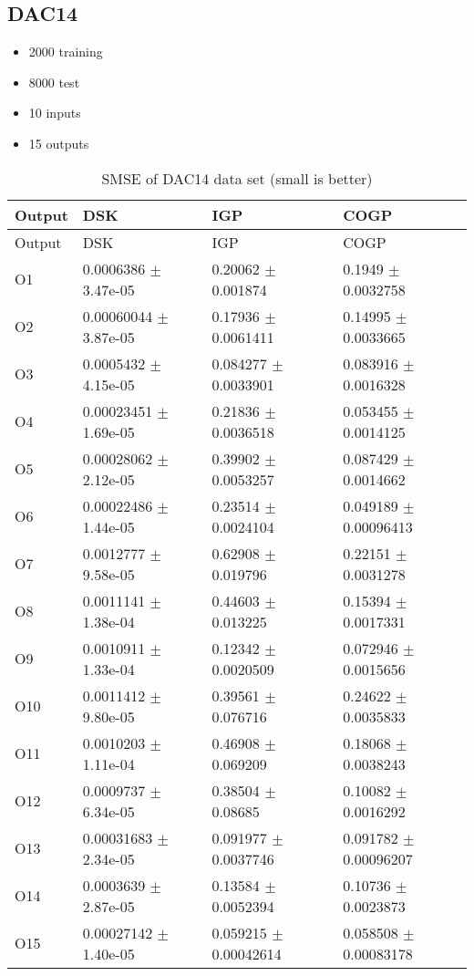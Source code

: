 \subsection{DAC14}\label{dac14}

\begin{itemize}
\item
  2000 training
\item
  8000 test
\item
  10 inputs
\item
  15 outputs
\end{itemize}

\begin{longtable}[]{@{}llll@{}}
\caption{SMSE of DAC14 data set (small is better)}\tabularnewline
\toprule
Output & DSK & IGP & COGP\tabularnewline
\midrule
\endfirsthead
\toprule
Output & DSK & IGP & COGP\tabularnewline
\midrule
\endhead
O1 & 0.0006386 \(\pm\) 3.47e-05 & 0.20062 \(\pm\) 0.001874 & 0.1949
\(\pm\) 0.0032758\tabularnewline
O2 & 0.00060044 \(\pm\) 3.87e-05 & 0.17936 \(\pm\) 0.0061411 & 0.14995
\(\pm\) 0.0033665\tabularnewline
O3 & 0.0005432 \(\pm\) 4.15e-05 & 0.084277 \(\pm\) 0.0033901 & 0.083916
\(\pm\) 0.0016328\tabularnewline
O4 & 0.00023451 \(\pm\) 1.69e-05 & 0.21836 \(\pm\) 0.0036518 & 0.053455
\(\pm\) 0.0014125\tabularnewline
O5 & 0.00028062 \(\pm\) 2.12e-05 & 0.39902 \(\pm\) 0.0053257 & 0.087429
\(\pm\) 0.0014662\tabularnewline
O6 & 0.00022486 \(\pm\) 1.44e-05 & 0.23514 \(\pm\) 0.0024104 & 0.049189
\(\pm\) 0.00096413\tabularnewline
O7 & 0.0012777 \(\pm\) 9.58e-05 & 0.62908 \(\pm\) 0.019796 & 0.22151
\(\pm\) 0.0031278\tabularnewline
O8 & 0.0011141 \(\pm\) 1.38e-04 & 0.44603 \(\pm\) 0.013225 & 0.15394
\(\pm\) 0.0017331\tabularnewline
O9 & 0.0010911 \(\pm\) 1.33e-04 & 0.12342 \(\pm\) 0.0020509 & 0.072946
\(\pm\) 0.0015656\tabularnewline
O10 & 0.0011412 \(\pm\) 9.80e-05 & 0.39561 \(\pm\) 0.076716 & 0.24622
\(\pm\) 0.0035833\tabularnewline
O11 & 0.0010203 \(\pm\) 1.11e-04 & 0.46908 \(\pm\) 0.069209 & 0.18068
\(\pm\) 0.0038243\tabularnewline
O12 & 0.0009737 \(\pm\) 6.34e-05 & 0.38504 \(\pm\) 0.08685 & 0.10082
\(\pm\) 0.0016292\tabularnewline
O13 & 0.00031683 \(\pm\) 2.34e-05 & 0.091977 \(\pm\) 0.0037746 &
0.091782 \(\pm\) 0.00096207\tabularnewline
O14 & 0.0003639 \(\pm\) 2.87e-05 & 0.13584 \(\pm\) 0.0052394 & 0.10736
\(\pm\) 0.0023873\tabularnewline
O15 & 0.00027142 \(\pm\) 1.40e-05 & 0.059215 \(\pm\) 0.00042614 &
0.058508 \(\pm\) 0.00083178\tabularnewline
\bottomrule
\end{longtable}

